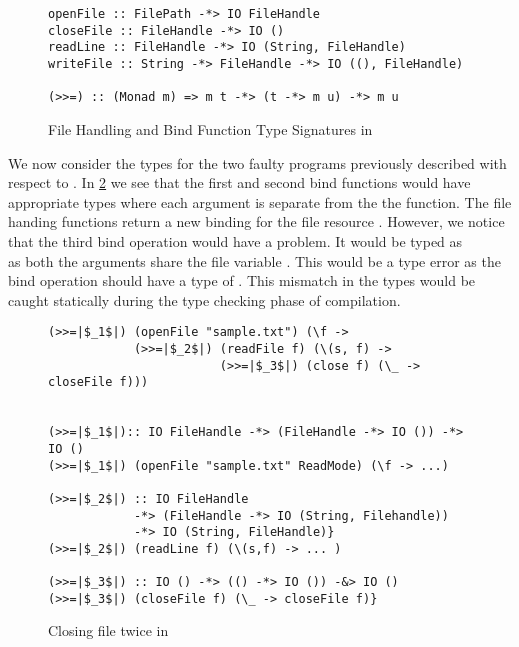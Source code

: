 \begin{figure}[h]
  \begin{framed}
    \begin{verbatim}
openFile :: FilePath -*> IO FileHandle
closeFile :: FileHandle -*> IO ()
readLine :: FileHandle -*> IO (String, FileHandle)
writeFile :: String -*> FileHandle -*> IO ((), FileHandle)

(>>=) :: (Monad m) => m t -*> (t -*> m u) -*> m u
    \end{verbatim}
  \end{framed}
  \caption{File Handling and Bind Function Type Signatures in \qub{}}
  \label{fig:qub-file-handling-functions}
\end{figure}

We now consider the types for the two faulty programs previously described with respect to \qub{}.
In \cref{fig:qub-close-file-twice} we see that the first 
and second bind  functions would have appropriate types
where each argument is separate from the the function. The file handing functions
return a new binding for the file resource . However, we notice that the third bind operation
 would have a problem. It would be typed as
\\
as both the arguments share the file variable . This would be a type error
as the bind operation should have a type of .
This mismatch in the types would be caught statically during the type checking phase of compilation.

\begin{figure}[h]
\begin{framed}
\begin{verbatim}
(>>=|$_1$|) (openFile "sample.txt") (\f ->
            (>>=|$_2$|) (readFile f) (\(s, f) ->
                        (>>=|$_3$|) (close f) (\_ -> closeFile f)))


(>>=|$_1$|):: IO FileHandle -*> (FileHandle -*> IO ()) -*> IO ()
(>>=|$_1$|) (openFile "sample.txt" ReadMode) (\f -> ...)

(>>=|$_2$|) :: IO FileHandle
            -*> (FileHandle -*> IO (String, Filehandle))
            -*> IO (String, FileHandle)}
(>>=|$_2$|) (readLine f) (\(s,f) -> ... )

(>>=|$_3$|) :: IO () -*> (() -*> IO ()) -&> IO ()
(>>=|$_3$|) (closeFile f) (\_ -> closeFile f)}
\end{verbatim}
\end{framed}
\caption{Closing file twice in \qub{}}
\label{fig:qub-close-file-twice}
\end{figure}

